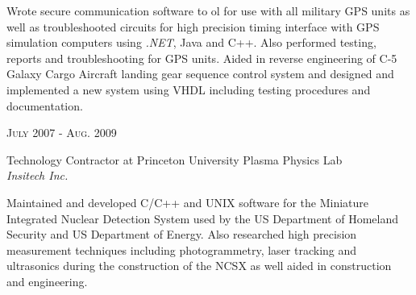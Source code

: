 \documentclass[10pt]{article} %
\begin{document}
{\begin{minipage}[t]{0.5\textwidth}
\small{Wrote secure communication software to
ol for use with all military GPS units as well as troubleshooted circuits for high precision timing interface with GPS simulation computers using \emph{.NET}, Java and C++. Also performed testing, reports and troubleshooting for GPS units. Aided in reverse engineering of C-5 Galaxy Cargo Aircraft landing gear sequence control system and designed and implemented a new system using VHDL including testing procedures and documentation.}\\


{\raggedleft\textsc{July 2007 - Aug. 2009}\par}

{\raggedright\large Technology Contractor at Princeton University Plasma Physics Lab\\
\textit{Insitech Inc.}\\[5pt]}

\small{Maintained and developed C/C++ and UNIX software for the Miniature Integrated Nuclear Detection System used by the US Department of Homeland Security and US Department of Energy. Also researched high precision measurement techniques including photogrammetry, laser tracking and ultrasonics during the construction of the NCSX as well aided in construction and engineering.
}\\


%
%


%
%


\end{minipage}}
\end{document}
